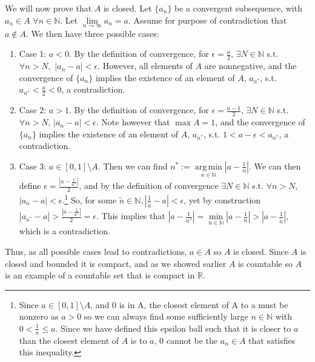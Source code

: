 \documentclass[11pt]{article} %
\DeclareMathOperator*{\argmin}{arg\,min}
\begin{document}
We will now prove that $A$ is closed. Let $\{ a_n \}$ be a convergent subsequence, with $a_n \in A$ $\forall n \in \mathbb{N}$. Let $\lim\limits_{n\rightarrow \infty} a_n = a$. Assume for purpose of contradiction that $a \notin A$. We then have three possible cases:
\begin{enumerate}
\item Case 1: $a<0$. By the definition of convergence, for $\epsilon = \frac{a}{2}$, $\exists N \in \mathbb{N}$ s.t. $\forall n>N,$ $|a_n - a|<\epsilon.$ However, all elements of $A$ are nonnegative, and the convergence of $\{a_n\}$ implies the existence of an element of $A$, $a_{n^*}$, s.t. $a_{n^*}< \frac{a}{2}<0$, a contradiction.
\item Case 2: $a>1$.  By the definition of convergence, for $\epsilon = \frac{a-1}{2}$, $\exists N \in \mathbb{N}$ s.t. $\forall n>N$, $|a_n - a|<\epsilon.$ Note however that $\max A =1$, and the convergence of $\{a_n\}$ implies the existence of an element of $A$, $a_{n^*}$, s.t. $1<a-\epsilon<a_{n^*}$, a contradiction.
\item Case 3: $a \in [0,1]\setminus A$. Then we can find $n^*:= \argmin\limits_{n \in \mathbb{N}} |a - \frac{1}{n}|$. We can then define $\epsilon = \frac{|a - \frac{1}{n^*}|}{2}$, and by the definition of convergence $\exists N \in \mathbb{N}$ s.t. $\forall n>N,$ $|a_n - a|<\epsilon$.\footnote{Since $a \in [0,1] \setminus A$, and 0 is in A, the closest element of A to a must be nonzero as $a>0$ so we can always find some sufficiently large $n\in \mathbb{N}$ with $0<\frac{1}{n}\leq a$. Since we have defined this epsilon ball such that it is closer to $a$ than the closest element of $A$ is to $a$, 0 cannot be the $a_n \in A$ that satisfies this inequality.} So, for some $\tilde{n} \in \mathbb{N}, |\frac{1}{\tilde{n}} -a|<\epsilon$, yet by construction $|a_{n^*} - a|>\frac{|a - \frac{1}{n^*}|}{2}=\epsilon$. This implies that $|a - \frac{1}{n^*}| = \min\limits_{n \in \mathbb{N}} |a - \frac{1}{n}| > |a - \frac{1}{\tilde{n}}|$, which is a contradiction. %
\end{enumerate}
Thus, as all possible cases lead to contradictions, $a \in A$ so $A$ is closed. Since $A$ is closed and bounded it is compact, and as we showed earlier $A$ is countable so $A$ is an example of a countable set that is compact in $\mathbb{R}$.
%
%
\end{document}

